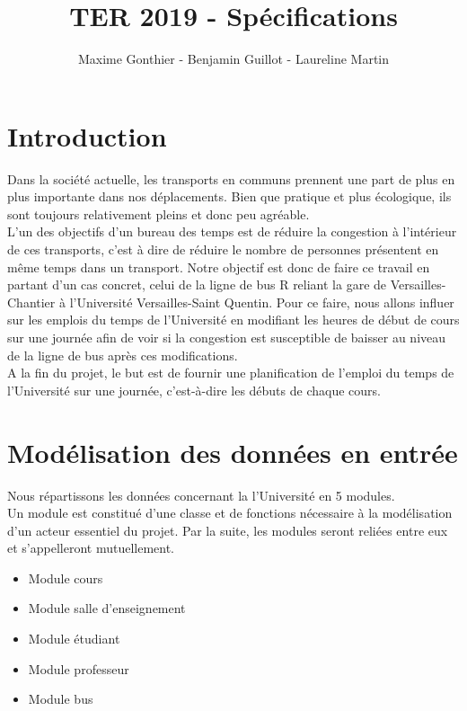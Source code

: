 \documentclass[a4paper,11pt]{article}
\title{TER 2019 - Spécifications}
\author{Maxime Gonthier - Benjamin Guillot - Laureline Martin}
\begin{document}
	\clearpage
	\maketitle

\newpage
\tableofcontents

\newpage
\section{Introduction}
Dans la société actuelle, les transports en communs prennent une part de plus en plus importante dans nos déplacements. Bien que pratique et plus écologique, ils sont toujours relativement pleins et donc peu agréable.\\
 L'un des objectifs d'un bureau des temps est de réduire la congestion à l'intérieur de ces transports, c'est à dire de réduire le nombre de personnes présentent en même temps dans un transport. 
Notre objectif est donc de faire ce travail en partant d'un cas concret, celui de la ligne de bus R reliant la gare de Versailles-Chantier à l'Université Versailles-Saint Quentin. Pour ce faire, nous allons influer sur les emplois du temps de l'Université en modifiant les heures de début de cours sur une journée afin de voir si la congestion est susceptible de baisser au niveau de la ligne de bus après ces modifications.\\
A la fin du projet, le but est de fournir une planification de l'emploi du temps de l'Université sur une journée, c'est-à-dire les débuts de chaque cours.

\section{Modélisation des données en entrée}
	Nous répartissons les données concernant la l'Université en 5 modules.\\
	Un module est constitué d'une classe et de fonctions nécessaire à la modélisation d'un acteur essentiel du projet. Par la suite, les modules seront reliées entre eux et s'appelleront mutuellement.
	\begin{itemize}
		\item Module cours
		\item Module salle d'enseignement
		\item Module étudiant
		\item Module professeur
		\item Module bus
	\end{itemize}
\end{document}
